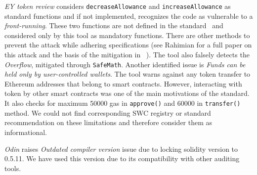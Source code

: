 \textit{EY token review} considers \texttt{decreaseAllowance} and \texttt{increaseAllowance} as standard \erc functions and if not implemented, recognizes the code as vulnerable to a \textit{front-running}. These two functions are not defined in the \erc standard~\cite{ERC20Std} and considered only by this tool as mandatory functions. There are other methods to prevent the attack while adhering \erc specifications (see Rahimian \etal for a full paper on this attack and the basis of the mitigation in \sys~\cite{ERC20MWA}). The tool also falsely detects the \textit{Overflow}, mitigated through \texttt{SafeMath}. Another identified issue is \textit{Funds can be held only by user-controlled wallets}. The tool warns against any token transfer to Ethereum addresses that belong to smart contracts. However, interacting with \erc token by other smart contracts was one of the main motivations of the standard. It also checks for maximum 50000 gas in \texttt{approve()} and 60000 in \texttt{transfer()} method. We could not find corresponding SWC registry or standard recommendation on these limitations and therefore consider them as informational.

\textit{Odin} raises \textit{Outdated compiler version} issue due to locking solidity version to 0.5.11. We have used this version due to its compatibility with other auditing tools.